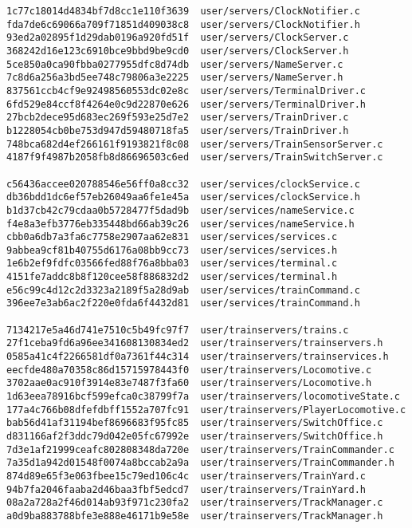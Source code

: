 \documentclass[twoside,a4paper]{refart}
\begin{document}
\begin{verbatim}
1c77c18014d4834bf7d8cc1e110f3639  user/servers/ClockNotifier.c
fda7de6c69066a709f71851d409038c8  user/servers/ClockNotifier.h
93ed2a02895f1d29dab0196a920fd51f  user/servers/ClockServer.c
368242d16e123c6910bce9bbd9be9cd0  user/servers/ClockServer.h
5ce850a0ca90fbba0277955dfc8d74db  user/servers/NameServer.c
7c8d6a256a3bd5ee748c79806a3e2225  user/servers/NameServer.h
837561ccb4cf9e92498560553dc02e8c  user/servers/TerminalDriver.c
6fd529e84ccf8f4264e0c9d22870e626  user/servers/TerminalDriver.h
27bcb2dece95d683ec269f593e25d7e2  user/servers/TrainDriver.c
b1228054cb0be753d947d59480718fa5  user/servers/TrainDriver.h
748bca682d4ef266161f9193821f8c08  user/servers/TrainSensorServer.c
4187f9f4987b2058fb8d86696503c6ed  user/servers/TrainSwitchServer.c

c56436accee020788546e56ff0a8cc32  user/services/clockService.c
db36bdd1dc6ef57eb26049aa6fe1e45a  user/services/clockService.h
b1d37cb42c79cdaa0b5728477f5dad9b  user/services/nameService.c
f4e8a3efb3776eb335448bd66ab39c26  user/services/nameService.h
cbb0a6db7a3fa6c7758e2907aa62e831  user/services/services.c
9abbea9cf81b40755d6176a08bb9cc73  user/services/services.h
1e6b2ef9fdfc03566fed88f76a8bba03  user/services/terminal.c
4151fe7addc8b8f120cee58f886832d2  user/services/terminal.h
e56c99c4d12c2d3323a2189f5a28d9ab  user/services/trainCommand.c
396ee7e3ab6ac2f220e0fda6f4432d81  user/services/trainCommand.h

7134217e5a46d741e7510c5b49fc97f7  user/trainservers/trains.c
27f1ceba9fd6a96ee341608130834ed2  user/trainservers/trainservers.h
0585a41c4f2266581df0a7361f44c314  user/trainservers/trainservices.h
eecfde480a70358c86d15715978443f0  user/trainservers/Locomotive.c
3702aae0ac910f3914e83e7487f3fa60  user/trainservers/Locomotive.h
1d63eea78916bcf599efca0c38799f7a  user/trainservers/locomotiveState.c
177a4c766b08dfefdbff1552a707fc91  user/trainservers/PlayerLocomotive.c
bab56d41af31194bef8696683f95fc85  user/trainservers/SwitchOffice.c
d831166af2f3ddc79d042e05fc67992e  user/trainservers/SwitchOffice.h
7d3e1af21999ceafc802808348da720e  user/trainservers/TrainCommander.c
7a35d1a942d01548f0074a8bccab2a9a  user/trainservers/TrainCommander.h
874d89e65f3e063fbee15c79ed106c4c  user/trainservers/TrainYard.c
94b7fa2046faaba2d46baa3fbf5edcd7  user/trainservers/TrainYard.h
08a2a728a2f46d014ab93f971c230fa2  user/trainservers/TrackManager.c
a0d9ba883788bfe3e888e46171b9e58e  user/trainservers/TrackManager.h
\end{verbatim}
\end{document}
